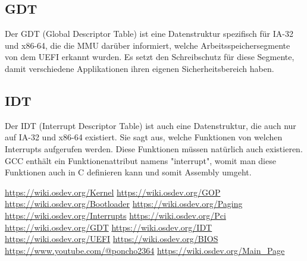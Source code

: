 \documentclass[12pt]{article}
\begin{document}
	\subsection{GDT}
	Der GDT\cite{gdt} (Global Descriptor Table) ist eine Datenstruktur spezifisch für IA-32 und x86-64, die die MMU darüber informiert, welche Arbeitsspeichersegmente von dem UEFI\cite{uefi} erkannt wurden. Es setzt den Schreibschutz für diese Segmente, damit verschiedene Applikationen ihren eigenen Sicherheitsbereich haben. 
	\subsection{IDT}
	Der IDT\cite{idt} (Interrupt Descriptor Table) ist auch eine Datenstruktur, die auch nur auf IA-32 und x86-64 existiert. Sie sagt aus, welche Funktionen von welchen Interrupts\cite{interrupts} aufgerufen werden. Diese Funktionen müssen natürlich auch existieren. GCC enthält ein Funktionenattribut namens "interrupt", womit man diese Funktionen auch in C definieren kann und somit Assembly umgeht.
	
	\newpage
	
	\begin{thebibliography}{10}
		
		 \url{https://wiki.osdev.org/Kernel}
		 \url{https://wiki.osdev.org/GOP}
		 \url{https://wiki.osdev.org/Bootloader}
		 \url{https://wiki.osdev.org/Paging}
		 \url{https://wiki.osdev.org/Interrupts}
		 \url{https://wiki.osdev.org/Pci}
		 \url{https://wiki.osdev.org/GDT}
		 \url{https://wiki.osdev.org/IDT}
		 \url{https://wiki.osdev.org/UEFI}
		 \url{https://wiki.osdev.org/BIOS}
		 \url{https://www.youtube.com/@poncho2364}
		 \url{https://wiki.osdev.org/Main_Page}
		
	\end{thebibliography}
	
\end{document}
